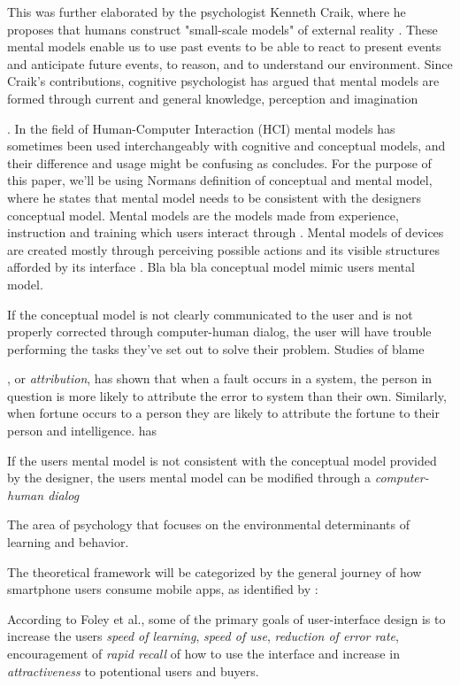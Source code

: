 This was further elaborated by the psychologist Kenneth Craik, where he proposes that humans construct "small-scale models" of external reality \cite{Craik1967}. These mental models enable us to use past events to be able to react to present events and anticipate future events, to reason, and to understand our environment. Since Craik's contributions, cognitive psychologist has argued that mental models are formed through current and general knowledge, perception and imagination \cite{Johnson-Laird2001} . In the field of Human-Computer Interaction (HCI) mental models has sometimes been used interchangeably with cognitive and conceptual models, and their difference and usage might be confusing as \cite{Staggers1993} concludes. For the purpose of this paper, we'll be using Normans \cite{Norman2013a} definition of conceptual and mental model, where he states that mental model needs to be consistent with the designers conceptual model. Mental models are the models made from experience, instruction and training which users interact through \cite{Norman2013a}. Mental models of devices are created mostly through perceiving possible actions and its visible structures afforded by its interface \cite{Norman2013a}. Bla bla bla conceptual model mimic users mental model. 

If the conceptual model is not clearly communicated to the user and is not properly corrected through computer-human dialog, the user will have trouble performing the tasks they've set out to solve their problem. Studies of blame , or \textit{attribution}, has shown that when a fault occurs in a system, the person in question is more likely to attribute the error to system than their own. Similarly, when fortune occurs to a person they are likely to attribute the fortune to their person and intelligence.  has

If the users mental model is not consistent with the conceptual model provided by the designer, the users mental model can be modified through a \textit{computer-human dialog}



The area of psychology that focuses on the environmental determinants of learning and behavior.

The theoretical framework will be categorized by the general journey of how smartphone users consume mobile apps, as identified by \cite{IGIGlobal2016}:

According to Foley et al., \cite{Foley1996} some of the primary goals of user-interface design is to increase the users \textit{speed of learning}, \textit{speed of use}, \textit{reduction of error rate}, encouragement of \textit{rapid recall} of how to use the interface and increase in \textit{attractiveness} to potentional users and buyers.

